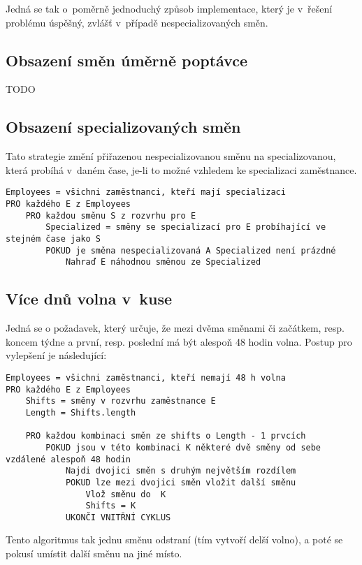 \documentclass[twoside]{ctuthesis}
\begin{document}
Jedná se tak o~poměrně jednoduchý způsob implementace, který je v~řešení problému úspěšný, zvlášť v~případě nespecializovaných směn.


\subsection{Obsazení směn úměrně poptávce}

TODO

\subsection{Obsazení specializovaných směn}
Tato strategie změní přiřazenou nespecializovanou směnu na specializovanou, která probíhá v~daném čase, je-li to možné vzhledem ke specializaci zaměstnance.

\begin{lstlisting}[caption={Pseudokód pro vylepšování obsazení specializovaných směn}]
Employees = všichni zaměstnanci, kteří mají specializaci
PRO každého E z Employees
	PRO každou směnu S z rozvrhu pro E
		Specialized = směny se specializací pro E probíhající ve stejném čase jako S
		POKUD je směna nespecializovaná A Specialized není prázdné
		 	Nahraď E náhodnou směnou ze Specialized
\end{lstlisting}

\subsection{Více dnů volna v~kuse}
Jedná se o požadavek, který určuje, že mezi dvěma směnami či začátkem, resp. koncem týdne a první, resp. poslední má být alespoň 48 hodin volna. Postup pro vylepšení je následující:

\begin{lstlisting}[caption={Pseudokód pro vylepšování obsazení specializovaných směn}]
Employees = všichni zaměstnanci, kteří nemají 48 h volna
PRO každého E z Employees
	Shifts = směny v rozvrhu zaměstnance E
	Length = Shifts.length

	PRO každou kombinaci směn ze shifts o Length - 1 prvcích
		POKUD jsou v této kombinaci K některé dvě směny od sebe vzdálené alespoň 48 hodin
			Najdi dvojici směn s druhým největším rozdílem
			POKUD lze mezi dvojici směn vložit další směnu
				Vlož směnu do  K
				Shifts = K
			UKONČI VNITŘNÍ CYKLUS
\end{lstlisting}

Tento algoritmus tak jednu směnu odstraní (tím vytvoří delší volno), a poté se pokusí umístit další směnu na jiné místo.
\end{document}
